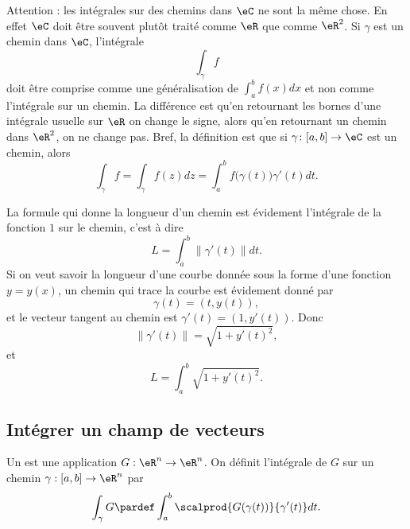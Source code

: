 \begin{remark}      \label{RemiqswPd}
    Attention : les intégrales sur des chemins dans \( \eC\) ne sont la même chose. En effet \( \eC\) doit être souvent plutôt traité comme \( \eR\) que comme \( \eR^2\). Si \( \gamma\) est un chemin dans \( \eC\), l'intégrale
    \begin{equation}
        \int_{\gamma}f
    \end{equation}
    doit être comprise comme une généralisation de \( \int_a^bf(x)dx\) et non comme l'intégrale sur un chemin. La différence est qu'en retournant les bornes d'une intégrale usuelle sur \( \eR\) on change le signe, alors qu'en retournant un chemin dans \( \eR^2\), on ne change pas. Bref, la définition est que si \( \gamma\colon \mathopen[ a , b \mathclose]\to \eC\) est un chemin, alors
    \begin{equation}
        \int_{\gamma}f=\int_{\gamma}f(z)dz=\int_a^bf\big( \gamma(t) \big)\gamma'(t)dt.
    \end{equation}
\end{remark}


La formule qui donne la longueur d'un chemin est évidement l'intégrale de la fonction $1$ sur le chemin, c'est à dire
\begin{equation}
	L=\int_a^b\| \gamma'(t) \|dt.
\end{equation}
Si on veut savoir la longueur d'une courbe donnée sous la forme d'une fonction $y=y(x)$, un chemin qui trace la courbe est évidement donné par
\begin{equation}
	\gamma(t)=(t,y(t)),
\end{equation}
et le vecteur tangent au chemin est $\gamma'(t)=(1,y'(t))$. Donc
\begin{equation}
	\| \gamma'(t) \|=\sqrt{1+y'(t)^2},
\end{equation}
et 
\begin{equation}			\label{EqLongFonction}
	L=\int_a^b\sqrt{1+y'(t)^2}.
\end{equation}


\subsection{Intégrer un champ de vecteurs}
Un  est une application $G : \eR^n \to
\eR^n$. On définit l'intégrale de $G$ sur un chemin $\gamma : [a,b]
\to \eR^n$ par
\begin{equation*}
  \int_\gamma G \pardef \int_a^b \scalprod {G(\gamma(t))}{\gamma^\prime(t)} d t.
\end{equation*}

